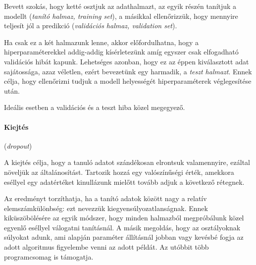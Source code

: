 
Bevett szokás, hogy ketté osztjuk az adathalmazt, az egyik részén tanítjuk a
modellt (\textit{tanító halmaz, training set}), a másikkal ellenőrizzük, hogy mennyire teljesít jól a predikció (\textit{validációs halmaz, validation set}).

Ha csak ez a két halmazunk lenne, akkor előfordulhatna, hogy a hiperparaméterekkel
addig-addig kísérletezünk amíg egyszer csak elfogadható validációs hibát kapunk. 
Lehetséges azonban, hogy ez az éppen kiválasztott adat sajátossága, azaz véletlen,
ezért bevezetünk egy harmadik, a \textit{teszt halmazt}. Ennek célja, hogy ellenőrizni
tudjuk a modell helyességét hiperparaméterek véglegesítése után.





Ideális esetben a validációs és a teszt hiba közel megegyező.


\paragraph{Kiejtés} (\textit{dropout})


A kiejtés célja, hogy a tanuló adatot szándékosan elrontsuk valamennyire, ezáltal 
növeljük az általánosítást.
Tartozik hozzá egy valószínűségi érték, amekkora eséllyel
egy adatértéket kinullázunk mielőtt tovább adjuk a következő rétegnek.



Az eredményt torzíthatja, ha a tanító adatok között
nagy a relatív elemszámkülönbség: ezt nevezzük kiegyensúlyozatlanságnak.
Ennek kiküszöbölésére az egyik módszer, hogy minden halmazból 
megpróbálunk közel egyenlő eséllyel válogatni tanításnál. A másik megoldás, hogy az 
osztályoknak súlyokat adunk,
ami alapján paraméter állításnál jobban vagy kevésbé fogja
az adott algoritmus figyelembe venni az adott példát. Az utóbbit több programcsomag is támogatja.

